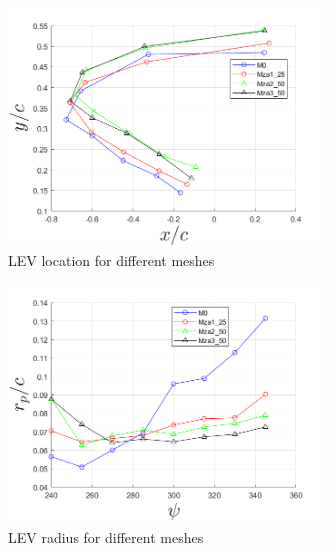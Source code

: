 

\begin{figure}[H]
	\centering
	\includegraphics[width=0.75\textwidth]{figures/zonal_adapt_results/LEV/LEV_location}
	\caption{ LEV location for different meshes}
	\label{fig:zonal_LEV_location}
\end{figure}


\begin{figure}[H]
\centering
\includegraphics[width=0.75\textwidth]{figures/zonal_adapt_results/LEV/LEV_radius_vp}
\caption{ LEV radius for different meshes}
\label{fig:zonal_LEV_radius}
\end{figure}
